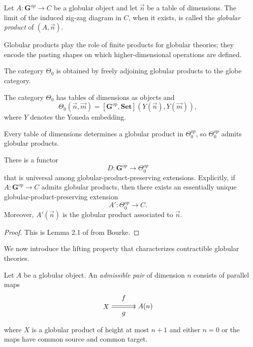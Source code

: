 \documentclass{tac}
\begin{document}
\begin{definition}
Let $A:\mathbf G^{op}\to C$ be a globular object and let $\vec n$ be a table of dimensions.
The limit of the induced zig-zag diagram in $C$, when it exists, is called the
\emph{globular product} of $(A,\vec n)$.
\end{definition}

Globular products play the role of finite products for globular theories; they encode the pasting shapes on which higher-dimensional operations are defined.

The category $\Theta_0$ is obtained by freely adjoining globular products to the globe category.

\begin{definition}
The category $\Theta_0$ has tables of dimensions as objects and
\[
\Theta_0(\vec n,\vec m)
=
[\mathbf G^{op},\mathbf{Set}]
(Y(\vec n),Y(\vec m)),
\]
where $Y$ denotes the Yoneda embedding.
\end{definition}

Every table of dimensions determines a globular product in
$\Theta_0^{op}$, so $\Theta_0^{op}$ admits globular products.

\begin{lemma}
There is a functor
\[
D:\mathbf G^{op}\longrightarrow\Theta_0^{op}
\]
that is universal among globular-product-preserving extensions. Explicitly, if
$A:\mathbf G^{op}\to C$ admits globular products, then there exists an essentially unique globular-product-preserving extension
\[
A':\Theta_0^{op}\to C.
\]
Moreover, $A'(\vec n)$ is the globular product associated to $\vec n$.
\end{lemma}

\begin{proof}
This is Lemma 2.1 of \cite{Bo2} from Bourke.
\end{proof}

We now introduce the lifting property that characterizes contractible globular theories.

\begin{definition}
Let $A$ be a globular object. An \emph{admissible pair} of dimension $n$ consists of parallel maps
\[
\begin{tikzpicture}[node distance=2cm]
    \node (A) {$X$};
    \node (B) [right of=A] {$A(n)$};
    \draw[transform canvas={yshift=0.3ex},->]
        (A) to node[above=3] {$f$} (B);
    \draw[transform canvas={yshift=-0.3ex},->,swap]
        (A) to node[below=3] {$g$} (B);
\end{tikzpicture}
\]
where $X$ is a globular product of height at most $n+1$ and either $n=0$ or the maps have common source and common target.
\end{definition}
\end{document}

